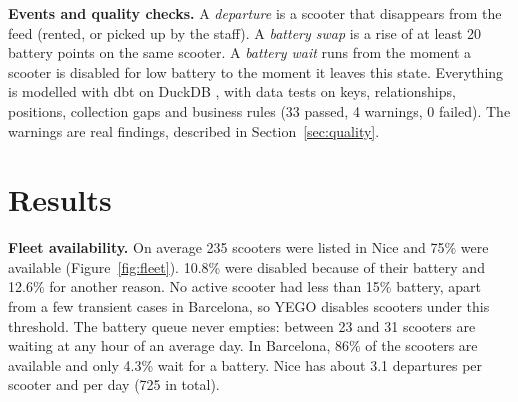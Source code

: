 \documentclass[11pt,a4paper]{article}
\begin{document}
\textbf{Events and quality checks.} A \emph{departure} is a scooter that disappears from the feed
(rented, or picked up by the staff). A \emph{battery swap} is a rise of at least 20 battery points on
the same scooter. A \emph{battery wait} runs from the moment a scooter is disabled for low battery
to the moment it leaves this state. Everything is modelled with dbt on DuckDB \cite{duckdb}, with
data tests on keys, relationships, positions, collection gaps and business rules
(33 passed, 4 warnings, 0 failed). The warnings are real findings, described in Section~\ref{sec:quality}.

\section{Results}

\textbf{Fleet availability.} On average 235 scooters were listed in Nice and 75\%
were available (Figure~\ref{fig:fleet}). 10.8\% were disabled because of their battery and
12.6\% for another reason. No active scooter had less than 15\% battery, apart from a few
transient cases in Barcelona, so YEGO disables scooters under this threshold. The battery queue
never empties: between 23 and 31 scooters are waiting at any hour of an average day.
In Barcelona, 86\% of the scooters are available and only 4.3\% wait for
a battery. Nice has about 3.1 departures per scooter and per day (725 in
total).
\end{document}
